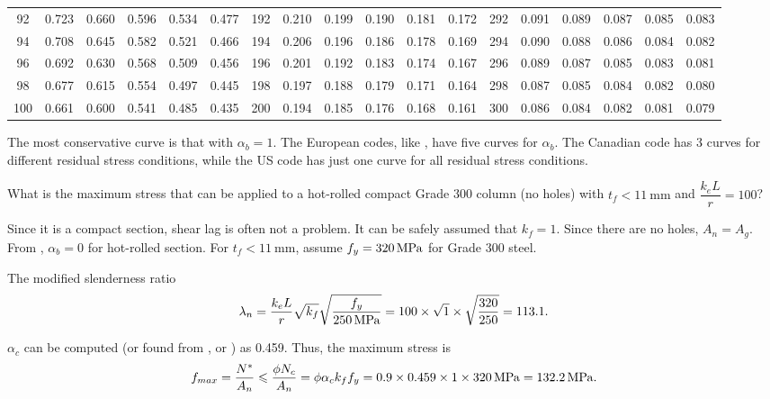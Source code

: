 \begin{table}[H]
\begin{tabular}{c|ccccc|c|ccccc|c|ccccc}
	    92      & 0.723 & 0.660 & 0.596 & 0.534 & 0.477 &     192     & 0.210 & 0.199 & 0.190 & 0.181 & 0.172 &     292     & 0.091 & 0.089 & 0.087 & 0.085 & 0.083 \\
	    94      & 0.708 & 0.645 & 0.582 & 0.521 & 0.466 &     194     & 0.206 & 0.196 & 0.186 & 0.178 & 0.169 &     294     & 0.090 & 0.088 & 0.086 & 0.084 & 0.082 \\
	    96      & 0.692 & 0.630 & 0.568 & 0.509 & 0.456 &     196     & 0.201 & 0.192 & 0.183 & 0.174 & 0.167 &     296     & 0.089 & 0.087 & 0.085 & 0.083 & 0.081 \\
	    98      & 0.677 & 0.615 & 0.554 & 0.497 & 0.445 &     198     & 0.197 & 0.188 & 0.179 & 0.171 & 0.164 &     298     & 0.087 & 0.085 & 0.084 & 0.082 & 0.080 \\
	    100     & 0.661 & 0.600 & 0.541 & 0.485 & 0.435 &     200     & 0.194 & 0.185 & 0.176 & 0.168 & 0.161 &     300     & 0.086 & 0.084 & 0.082 & 0.081 & 0.079 \\ \bottomrule
\end{tabular}
\end{table}

The most conservative curve is that with $\alpha_b=1$.
The European codes, like \NZSSTEEL{}, have five curves for $\alpha_b$.
The Canadian code has 3 curves for different residual stress conditions, while the US code has just one curve for all residual stress conditions.
\begin{exmp}
What is the maximum stress that can be applied to a hot-rolled compact Grade 300 column (no holes) with $t_f<\SI{11}{\mm}$ and $\dfrac{k_eL}{r}=100$?
\end{exmp}
\begin{solution}
Since it is a compact section, shear lag is often not a problem.
It can be safely assumed that $k_f=1$.
Since there are no holes, $A_n=A_g$.
From , $\alpha_b=0$ for hot-rolled section.
For $t_f<\SI{11}{\mm}$, assume $f_y=\SI{320}{\mega\pascal}$ for Grade 300 steel.

The modified slenderness ratio
\begin{gather*}
\lambda_n=\dfrac{k_eL}{r}\sqrt{k_f}\sqrt{\dfrac{f_y}{\SI{250}{\mega\pascal}}}=100\times\sqrt{1}\times\sqrt{\dfrac{320}{250}}=113.1.
\end{gather*}

$\alpha_c$ can be computed (or found from , or ) as \num{0.459}.
Thus, the maximum stress is
\begin{gather*}
f_{max}=\dfrac{N^*}{A_n}\leqslant\dfrac{\phi{}N_c}{A_n}=\phi\alpha_ck_ff_y=0.9\times0.459\times1\times\SI{320}{\mega\pascal}=\SI{132.2}{\mega\pascal}.
\end{gather*}
\end{solution}

